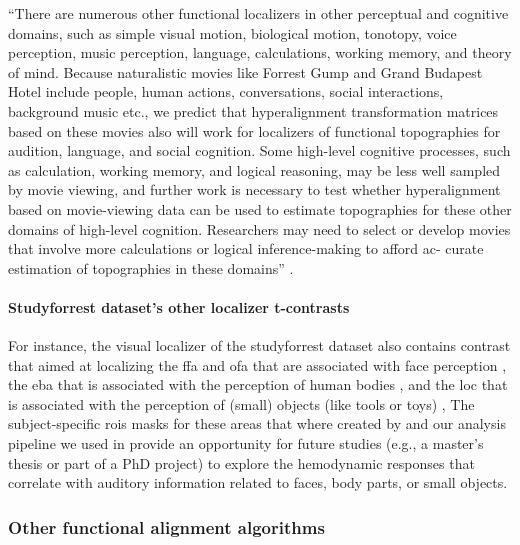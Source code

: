 %
``There are numerous other functional localizers in other perceptual and
cognitive domains, such as simple visual motion, biological motion, tonotopy,
voice perception, music perception, language, calculations, working memory, and
theory of mind. Because naturalistic movies like Forrest Gump and Grand Budapest
Hotel include people, human actions, conversations, social interactions,
background music etc., we predict that hyperalignment transformation matrices
based on these movies also will work for localizers of functional topographies
for audition, language, and social cognition. Some high-level cognitive
processes, such as calculation, working memory, and logical reasoning, may be
less well sampled by movie viewing, and further work is necessary to test
whether hyperalignment based on movie-viewing data can be used to estimate
topographies for these other domains of high-level cognition. Researchers may
need to select or develop movies that involve more calculations or logical
inference-making to afford ac- curate estimation of topographies in these
domains'' \citep{jiahui2020predicting}.


\paragraph{Studyforrest dataset's other localizer t-contrasts}


For instance, the visual localizer of the studyforrest dataset also contains
contrast that aimed at localizing the \ac{ffa} and \ac{ofa} that are associated
with face perception \citep{kanwisher1997ffa, pitcher2011occipitalfacearea}, the
\ac{eba} that is associated with the perception of human bodies
\citep{downing2001bodyarea}, and the \ac{loc} that is associated with the
perception of (small) objects (like tools or toys) \citep{malach1995loc},
%
The subject-specific \acp{roi} masks for these areas that where created by
\citep{sengupta2016extension} and our analysis pipeline we used in
\citet{haeusler2022processing} provide an opportunity for future studies (e.g.,
a master's thesis or part of a PhD project) to explore the hemodynamic responses
that correlate with auditory information related to faces, body parts, or small
objects.



\subsubsection{Other functional alignment algorithms}

